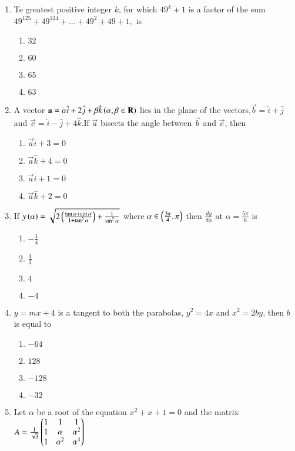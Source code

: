 \documentclass[journal,12pt,twocolumn]{IEEEtran}
\theoremstyle{remark}
\begin{document}
\begin{enumerate}
    \item Te greatest positive integer $k$, for which $49^k+1$ is a factor of the sum $49^{125} + 49^{124} + \dots+ 49^2 + 49 + 1,$ is
    \begin{enumerate}
        \item $32$
        \item $60$
        \item $65$
        \item $63$\\
    \end{enumerate}
    \item A vector $\mathbf{a} = \alpha\hat{i}+2\hat{j}+\beta\hat{k} \left(\alpha,\beta \in \mathbf{R}\right)$ lies in the plane of the vectors,$\vec{b}=\hat{i}+\hat{j}$ and $\vec{c}=\hat{i}-\hat{j}+4\hat{k}.$If $\vec{a}$ bisects the angle between $\vec{b}$ and $\vec{c}$, then
    \begin{enumerate}
        \item $\vec{a}\hat{i}+3=0$
        \item $\vec{a}\hat{k}+4=0$
        \item $\vec{a}\hat{i}+1=0$
        \item $\vec{a}\hat{k}+2=0$\\
    \end{enumerate}
    \item If $y\left(\alpha\right)=\sqrt{2\left(\frac{\tan\alpha+\cot\alpha}{1+\tan^2\alpha}\right)+\frac{1}{\sin^2\alpha}}$ where $\alpha \in \left(\frac{3\pi}{4},\pi\right)$ then $\frac{dy}{d\alpha}$ at $\alpha=\frac{5\pi}{6}$ is
    \begin{enumerate}
        \item $-\frac{1}{4}$
        \item $\frac{4}{3}$
        \item $4$
        \item $-4$\\
    \end{enumerate}
    \item $y = mx + 4$ is a tangent to both the parabolas, $y^2 = 4x$ and $x^2 = 2by$, then $b$ is equal to
    \begin{enumerate}
        \item $-64$
        \item $128$
        \item $-128$
        \item $-32$\\
    \end{enumerate}
    \item Let $\alpha$ be a root of the equation $x^2 + x+ 1= 0$ and the matrix $A=\frac{1}{\sqrt{3}}\begin{pmatrix}1&1&1\\1&\alpha&\alpha^2\\1&\alpha^2&\alpha^4\end{pmatrix}$

\end{enumerate}
\end{document}
